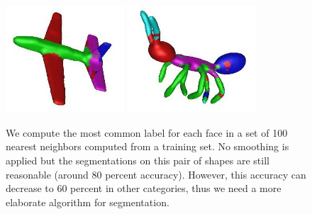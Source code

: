 \begin{figure}[t!] 
\begin{center} 
\includegraphics[height = 4cm]{figures/kNN1} 
\includegraphics[height = 4cm]{figures/kNN2}
\caption[kNN on topological vectors]{\label{fig:kNN} We compute the most common
	label for each face in a set of 100 nearest neighbors computed from
	a training set. No smoothing is applied but the segmentations on this pair of shapes are still reasonable
	(around 80 percent accuracy). However, this accuracy can decrease to 60 percent
	in other categories, thus we need a more elaborate algorithm for segmentation.}
\end{center}
\end{figure}







